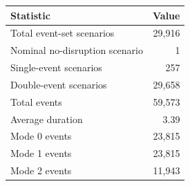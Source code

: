 \begin{tabular}{lr}
\toprule
Statistic & Value \\
\midrule
Total event-set scenarios & 29,916 \\
Nominal no-disruption scenario & 1 \\
Single-event scenarios & 257 \\
Double-event scenarios & 29,658 \\
Total events & 59,573 \\
Average duration & 3.39 \\
Mode 0 events & 23,815 \\
Mode 1 events & 23,815 \\
Mode 2 events & 11,943 \\
\bottomrule
\end{tabular}
